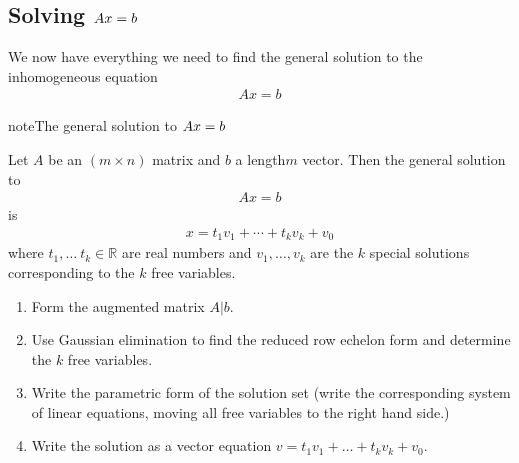 \documentclass[letterpaper,10pt,english]{jupyterBook}
\begin{document}
\subsection{Solving \protect\(Ax = b\protect\)}
\label{\detokenize{LinearAlgebra/linear_systems_matrices/matrices:solving-ax-b}}
\sphinxAtStartPar
We now have everything we need to find the general solution to the inhomogeneous equation
\begin{equation*}
\begin{split}Ax=b\end{split}
\end{equation*}
\begin{sphinxadmonition}{note}{The general solution to \protect\(Ax = b\protect\)}

\sphinxAtStartPar
Let \(A\) be an \((m \times n)\) matrix and \(b\) a length\sphinxhyphen{}\(m\) vector. Then the general solution to
\begin{equation*}
\begin{split}Ax=b\end{split}
\end{equation*}
\sphinxAtStartPar
is
\begin{equation*}
\begin{split}x = t_1v_1 + \cdots + t_kv_k + v_0\end{split}
\end{equation*}
\sphinxAtStartPar
where \(t_1, \ldots\ t_k \in \mathbb{R}\) are real numbers and \(v_1, \ldots, v_k\) are the \(k\) special solutions corresponding to the \(k\) free variables.
\begin{enumerate}
%
\item {} 
\sphinxAtStartPar
Form the augmented matrix \(A|b\).

\item {} 
\sphinxAtStartPar
Use Gaussian elimination to find the reduced row echelon form and determine the \(k\) free variables.

\item {} 
\sphinxAtStartPar
Write the parametric form of the solution set (write the corresponding system of linear equations, moving all free variables to the right hand side.)

\item {} 
\sphinxAtStartPar
Write the solution as a vector equation \(v = t_1v_1 + \ldots + t_kv_k + v_0\).

\end{enumerate}
\end{sphinxadmonition}
\end{document}
